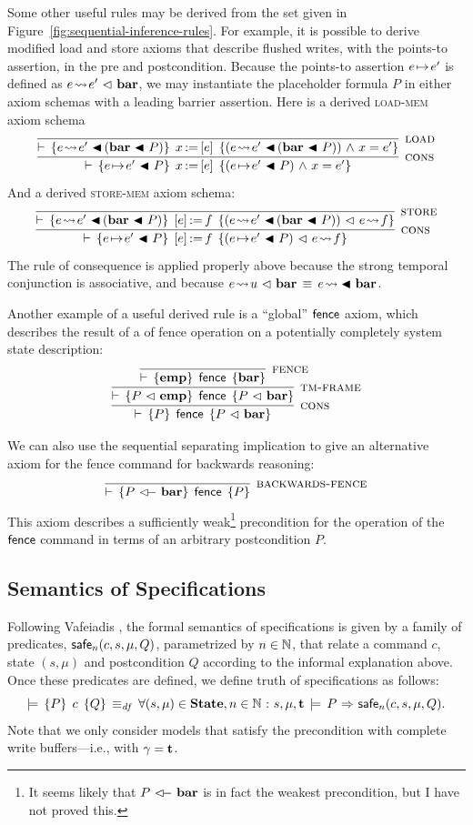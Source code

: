 \documentclass[11pt]{report}
\begin{document}
Some other useful rules may be derived from the set given in Figure~\ref{fig:sequential-inference-rules}. For example, it is possible to derive modified load and store axioms that describe flushed writes, with the points-to assertion, in the pre and postcondition. Because the points-to assertion $e \!\mapsto\! e'$ is defined as $e \!\leadsto\! e' \operatorname{\,\vartriangleleft\,} \mathbf{bar}$, we may instantiate the placeholder formula $P$ in either axiom schemas with a leading barrier assertion. Here is a derived \textsc{load-mem} axiom schema \[ \infer[\textsc{cons}]{\triple{e \fpointsto e' \fsseq P}{\cload{x}{e}}{(e \fpointsto e' \fsseq P) \conj x = e'}}{\infer[\textsc{load}]{\triple{e \fwriteu e' \fsseq (\fbaru \fsseq P)}{\cload{x}{e}}{(e \fwriteu e' \fsseq (\fbaru \fsseq P)) \conj x = e'}}{}}\] And a derived \textsc{store-mem} axiom schema: \[ \infer[\textsc{cons}]{\triple{e \fpointsto e' \fsseq P}{\cstore{e}{f}}{(e \fpointsto e' \fsseq P) \fseq e \fwriteu f}}{\infer[\textsc{store}]{\triple{e \fwriteu e' \fsseq (\fbaru \fsseq P)}{\cstore{e}{f}}{(e \fwriteu e' \fsseq (\fbaru \fsseq P)) \fseq e \fwriteu f}}{}}\]The rule of consequence is applied properly above because the strong temporal conjunction is associative, and because $e \!\leadsto\! u \operatorname{\,\vartriangleleft\,} \mathbf{bar} \,\equiv\, e \!\leadsto\! \operatorname{\,\blacktriangleleft\,} \mathbf{bar}$. 

Another example of a useful derived rule is a ``global'' $\operatorname{\mathsf{fence}}$ axiom, which describes the result of a of fence operation on a potentially completely system state description: \[ \infer[\textsc{cons}]{ \triple{P}{\cfence}{P \fseq \fbaru} }{ \infer[\textsc{tm-frame}]{\triple{P \fseq \femp}{\cfence}{P \fseq \fbaru}}{ \infer[\textsc{fence}]{\triple{\femp}{\cfence}{\fbaru}}{} } }\] 

We can also use the sequential separating implication to give an alternative axiom for the fence command for backwards reasoning: \[ \infer[\textsc{backwards-fence}]{\triple{P \fseqri \fbaru}{\cfence}{P}}{} \] This axiom describes a sufficiently weak\footnote{It seems likely that $P \fseqri \fbaru$ is in fact the weakest precondition, but I have not proved this.} precondition for the operation of the $\operatorname{\mathsf{fence}}$ command in terms of an arbitrary postcondition $P$.

\subsection{Semantics of Specifications}

Following Vafeiadis \cite{V11}, the formal semantics of specifications is given by a family of predicates, $\mathsf{safe}_{n}(c,s,\mu,Q)$, parametrized by $n \in \mathbb{N}$, that relate a command $c$, state $(s,\mu)$ and postcondition $Q$ according to the informal explanation above. Once these predicates are defined, we define truth of specifications as follows: \[ \models\,\left\lbrace P \right\rbrace\;c\;\left\lbrace Q \right\rbrace \operatorname{\;\equiv_{\mathit{df}}\;} \forall (s,\mu) \in \mathbf{State}, n \in \mathbb{N} \operatorname{\,:\,} s,\mu,\mathbf{t} \,\models\, P \operatorname{\,\Rightarrow\,} \mathsf{safe}_{n}(c,s,\mu,Q).\]
Note that we only consider models that satisfy the precondition with complete write buffers---i.e., with $\gamma = \mathbf{t}$. 
\end{document}
